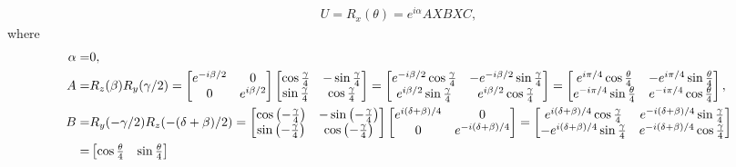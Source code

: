 \documentclass[en]{sol-man}
\begin{document}
\begin{sol}
    \begin{align}
        U=R_x(\theta)=e^{i\alpha}AXBXC,
    \end{align}
    where
    \begin{align}
        \alpha=&0,\\
        A=&R_z(\beta)R_y(\gamma/2)=\begin{bmatrix}
            e^{-i\beta/2}&0\\
            0&e^{i\beta/2}
        \end{bmatrix}\begin{bmatrix}
            \cos\frac{\gamma}{4}&-\sin\frac{\gamma}{4}\\
            \sin\frac{\gamma}{4}&\cos\frac{\gamma}{4}
        \end{bmatrix}=\begin{bmatrix}
            e^{-i\beta/2}\cos\frac{\gamma}{4}&-e^{-i\beta/2}\sin\frac{\gamma}{4}\\
            e^{i\beta/2}\sin\frac{\gamma}{4}&e^{i\beta/2}\cos\frac{\gamma}{4}
        \end{bmatrix}=\begin{bmatrix}
            e^{i\pi/4}\cos\frac{\theta}{4}&-e^{i\pi/4}\sin\frac{\theta}{4}\\
            e^{-i\pi/4}\sin\frac{\theta}{4}&e^{-i\pi/4}\cos\frac{\theta}{4}
        \end{bmatrix},\\
        \notag B=&R_y(-\gamma/2)R_z(-(\delta+\beta)/2)=\begin{bmatrix}
            \cos\left(-\frac{\gamma}{4}\right)&-\sin\left(-\frac{\gamma}{4}\right)\\
            \sin\left(-\frac{\gamma}{4}\right)&\cos\left(-\frac{\gamma}{4}\right)
        \end{bmatrix}\begin{bmatrix}
            e^{i(\delta+\beta)/4}&0\\
            0&e^{-i(\delta+\beta)/4}
        \end{bmatrix}=\begin{bmatrix}
            e^{i(\delta+\beta)/4}\cos\frac{\gamma}{4}&e^{-i(\delta+\beta)/4}\sin\frac{\gamma}{4}\\
            -e^{i(\delta+\beta)/4}\sin\frac{\gamma}{4}&e^{-i(\delta+\beta)/4}\cos\frac{\gamma}{4}
        \end{bmatrix}\\
        =&\begin{bmatrix}
            \cos\frac{\theta}{4}&\sin\frac{\theta}{4}\\

\end{bmatrix}
\end{align}
\end{sol}
\end{document}
